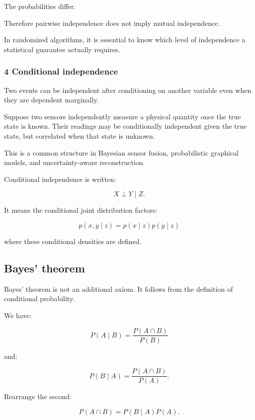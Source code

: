 The probabilities differ.

Therefore pairwise independence does not imply mutual independence.

In randomized algorithms, it is essential to know which level of independence a statistical guarantee actually requires.

\subsubsection{4 Conditional independence}\label{02-foundations-ii-ch023-conditional-independence}

\hypertarget{02-foundations-ii-ch023-conditional-independence}{}

Two events can be independent after conditioning on another variable even when they are dependent marginally.

Suppose two sensors independently measure a physical quantity once the true state is known. Their readings may be conditionally independent given the true state, but correlated when that state is unknown.

This is a common structure in Bayesian sensor fusion, probabilistic graphical models, and uncertainty-aware reconstruction.

Conditional independence is written:

\[
 X\perp Y\mid Z.
\]

It means the conditional joint distribution factors:

\[
 p(x,y\mid z)=p(x\mid z)p(y\mid z)
\]

where these conditional densities are defined.

\subsection{Bayes' theorem}\label{02-foundations-ii-ch023-bayes-theorem}

\hypertarget{02-foundations-ii-ch023-bayes-theorem}{}

Bayes' theorem is not an additional axiom. It follows from the definition of conditional probability.

We have:

\[
 P(A\mid B)=\frac{P(A\cap B)}{P(B)}
\]

and:

\[
 P(B\mid A)=\frac{P(A\cap B)}{P(A)}.
\]

Rearrange the second:

\[
 P(A\cap B)=P(B\mid A)P(A).
\]


